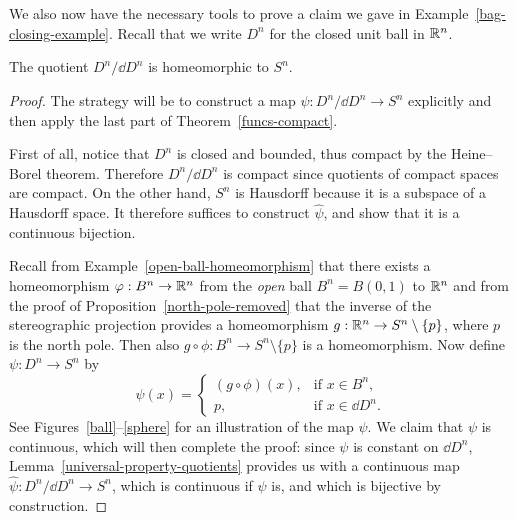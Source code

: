 We also now have the necessary tools to prove a claim we gave in Example~\ref{bag-closing-example}. Recall that we write $D^n$ for the closed unit ball in $\mathbb{R}^n$.
\begin{prop}
  \label{closing-the-bag}
  The quotient $D^n / \dd D^n$ is homeomorphic to $S^n$.
\end{prop}
\begin{proof}
  The strategy will be to construct a map $\hat{\psi}: D^n / \dd D^n \to S^n$ explicitly and then apply the last part of Theorem~\ref{funcs-compact}.
  
  First of all, notice that $D^n$ is closed and bounded, thus compact by the Heine--Borel theorem. Therefore $D^n / \dd D^n$ is compact since quotients of compact spaces are compact. On the other hand, $S^n$ is Hausdorff because it is a subspace of a Hausdorff space. It therefore suffices to construct $\hat{\psi}$, and show that it is a continuous bijection.
  
  Recall from Example~\ref{open-ball-homeomorphism} that there exists a homeomorphism $\varphi : B^n \to \mathbb{R}^n$ from the \emph{open} ball $B^n = B(0,1)$ to $\mathbb{R}^n$ and from the proof of Proposition~\ref{north-pole-removed} that the inverse of the stereographic projection provides a homeomorphism $g : \mathbb{R}^n \to S^n \setminus \{p\}$, where $p$ is the north pole. Then also $g \circ \phi : B^n \to S^n \setminus \{p\}$ is a homeomorphism. Now define $\psi : D^n \to S^n$ by
  \[
    \psi(x) = \begin{cases} (g \circ \phi)(x),& \text{if $x \in B^n$,} \\ p,& \text{if $x \in \dd D^n$.} \end{cases}
  \]
  See Figures~\ref{ball}--\ref{sphere} for an illustration of the map $\psi$. We claim that $\psi$ is continuous, which will then complete the proof: since $\psi$ is constant on $\dd D^n$, Lemma~\ref{universal-property-quotients} provides us with a continuous map $\hat{\psi} : D^n / \dd D^n \to S^n$, which is continuous if $\psi$ is, and which is bijective by construction.
  

\end{proof}
